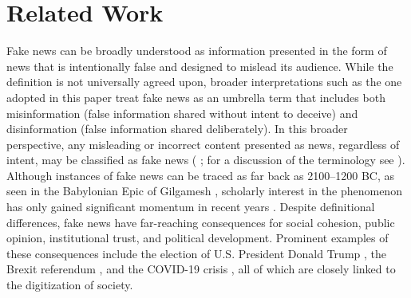 \documentclass[12pt,a4paper,twocolumn]{article}
\begin{document}
\section{Related Work}
Fake news can be broadly understood as information presented in the form of news that is intentionally false and designed to mislead its audience. While the definition is not universally agreed upon, broader interpretations such as the one adopted in this paper treat fake news as an umbrella term that includes both misinformation (false information shared without intent to deceive) and disinformation (false information shared deliberately). In this broader perspective, any misleading or incorrect content presented as news, regardless of intent, may be classified as fake news (\citeauthor{deOliveira2021} \citeyear{deOliveira2021}; for a discussion of the terminology see \citeauthor{article} \citeyear{article}). Although instances of fake news can be traced as far back as 2100–1200 BC, as seen in the Babylonian Epic of Gilgamesh \citep{Roozenbeek2024Psychology}, scholarly interest in the phenomenon has only gained significant momentum in recent years \citep{info15120742}. Despite definitional differences, fake news have far-reaching consequences for social cohesion, public opinion, institutional trust, and political development. Prominent examples of these consequences include the election of U.S. President Donald Trump \citep{allcott2017social}, the Brexit referendum \citep{orlando2023posttruth}, and the COVID-19 crisis \citep{ferreira2022impact}, all of which are closely linked to the digitization of society.
\end{document}

